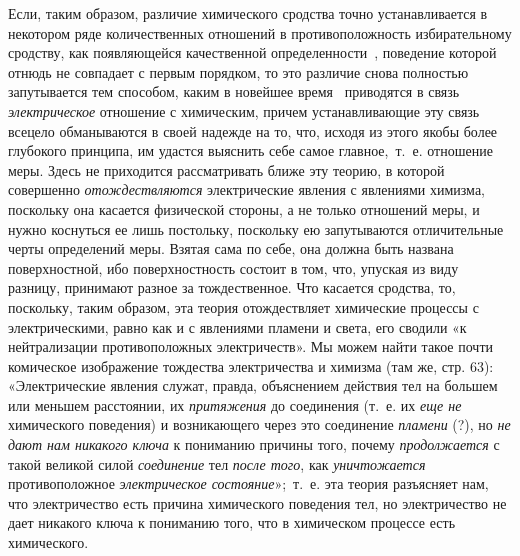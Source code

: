 Если, таким образом, различие химического сродства точно устанавливается в
некотором ряде количественных отношений в противоположность избирательному
сродству, как появляющейся качественной
определенности~,
поведение которой отнюдь не совпадает с первым порядком, то это различие
снова полностью запутывается тем способом, каким в новейшее
время~
приводятся в связь {\em электрическое} отношение с
химическим, причем устанавливающие эту связь всецело обманываются в своей
надежде на то, что, исходя из этого якобы более глубокого принципа, им
удастся выяснить себе самое главное,~т.~е. отношение меры. Здесь не
приходится рассматривать ближе эту теорию, в которой совершенно
{\em отождествляются} электрические явления с явлениями
химизма, поскольку она касается физической стороны, а не только отношений
меры, и нужно коснуться ее лишь постольку, поскольку ею запутываются
отличительные черты определений меры. Взятая сама по себе, она должна быть
названа поверхностной, ибо поверхностность состоит в том, что, упуская из
виду разницу, принимают разное за тождественное. Что касается сродства, то,
поскольку, таким образом, эта теория отождествляет химические процессы с
электрическими, равно как и с явлениями пламени и света, его сводили «к
нейтрализации противоположных электричеств». Мы можем найти такое почти
комическое изображение тождества электричества и химизма (там же, стр. 63):
«Электрические явления служат, правда, объяснением действия тел на большем
или меньшем расстоянии, их {\em притяжения} до
соединения (т.~е. их {\em еще не} химического
поведения) и возникающего через это соединение
{\em пламени} (?), но {\em не дают
нам никакого ключа} к пониманию причины того, почему
{\em продолжается} с такой великой силой
{\em соединение} тел {\em после
того}, как {\em уничтожается} противоположное
{\em электрическое состояние}»;~т.~е. эта теория
разъясняет нам, что электричество есть причина химического поведения тел,
но электричество не дает никакого ключа к пониманию того, что в химическом
процессе есть химического.

